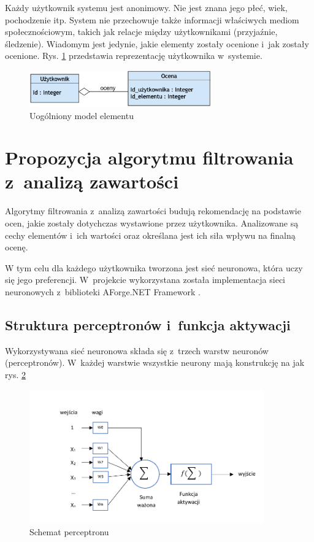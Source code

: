 \documentclass[twoside]{iisthesis}
\begin{document}
	Każdy użytkownik systemu jest anonimowy. Nie jest znana jego płeć, wiek, pochodzenie itp. System nie przechowuje także informacji właściwych mediom społecznościowym, takich jak relacje między użytkownikami (przyjaźnie, śledzenie). Wiadomym jest jedynie, jakie elementy zostały ocenione i~jak zostały ocenione. Rys. \ref{fig:modelUsera} przedstawia reprezentację użytkownika w~systemie.
	
	\begin{figure}[!ht] 
		\centering
		\includegraphics[width=0.7\textwidth]{modelUsera}
		\caption{Uogólniony model elementu}
		\label{fig:modelUsera}
	\end{figure}
		 
 	\section{Propozycja algorytmu filtrowania z~analizą zawartości}
	\label{s:propozycjaalgorytmucbf}
	 
	Algorytmy filtrowania z~analizą zawartości budują rekomendację na podstawie ocen, jakie zostały dotychczas wystawione przez użytkownika. Analizowane są cechy elementów i~ich wartości oraz określana jest ich siła wpływu na finalną ocenę. 
	
	W tym celu dla każdego użytkownika tworzona jest sieć neuronowa, która uczy się jego preferencji. W~projekcie wykorzystana została implementacja sieci neuronowych z~biblioteki AForge.NET Framework \cite{aforgenet}.
	 
	 \subsection{Struktura perceptronów i~funkcja aktywacji}
	 \label{sss:strukturaperceptronow}
	 
	 Wykorzystywana sieć neuronowa składa się z~trzech warstw neuronów (perceptronów). W~każdej warstwie wszystkie neurony mają konstrukcję na jak rys. \ref{fig:schematneuronu}
	 
	 \begin{figure}[!ht] 		 		 	
	 	\includegraphics[width=0.9\textwidth]{schematneuron}
	 	\caption{Schemat perceptronu}
	 	\label{fig:schematneuronu}
	 \end{figure}
	 
\end{document}
